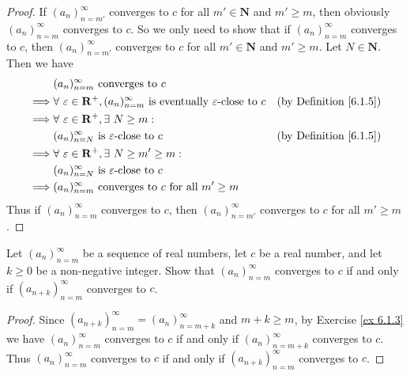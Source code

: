 \begin{proof}
    If \((a_n)_{n = m'}^\infty\) converges to \(c\) for all \(m' \in \mathbf{N}\) and \(m' \geq m\), then obviously \((a_n)_{n = m}^\infty\) converges to \(c\).
    So we only need to show that if \((a_n)_{n = m}^\infty\) converges to \(c\), then \((a_n)_{n = m'}^\infty\) converges to \(c\) for all \(m' \in \mathbf{N}\) and \(m' \geq m\).
    Let \(N \in \mathbf{N}\).
    Then we have
    \begin{align*}
                 & (a_n)_{n = m}^\infty \text{ converges to } c                                                                                                           \\
        \implies & \forall\ \varepsilon \in \mathbf{R}^+, (a_n)_{n = m}^\infty \text{ is eventually } \varepsilon\text{-close to } c & \text{(by Definition \ref{6.1.5})} \\
        \implies & \forall\ \varepsilon \in \mathbf{R}^+, \exists\ N \geq m :                                                                                             \\
                 & (a_n)_{n = N}^\infty \text{ is } \varepsilon\text{-close to } c                                                   & \text{(by Definition \ref{6.1.5})} \\
        \implies & \forall\ \varepsilon \in \mathbf{R}^+, \exists\ N \geq m' \geq m :                                                                                     \\
                 & (a_n)_{n = N}^\infty \text{ is } \varepsilon\text{-close to } c                                                                                        \\
        \implies & (a_n)_{n = m}^\infty \text{ converges to } c \text{ for all } m' \geq m
    \end{align*}
    Thus if \((a_n)_{n = m}^\infty\) converges to \(c\), then \((a_n)_{n = m'}^\infty\) converges to \(c\) for all \(m' \geq m\).
\end{proof}

\begin{exercise}\label{ex 6.1.4}
    Let \((a_n)_{n = m}^\infty\) be a sequence of real numbers, let \(c\) be a real number, and let \(k \geq 0\) be a non-negative integer.
    Show that \((a_n)_{n = m}^\infty\) converges to \(c\) if and only if \((a_{n + k})_{n = m}^\infty\) converges to \(c\).
\end{exercise}

\begin{proof}
    Since \((a_{n + k})_{n = m}^\infty = (a_n)_{n = m + k}^\infty\) and \(m + k \geq m\), by Exercise \ref{ex 6.1.3} we have \((a_n)_{n = m}^\infty\) converges to \(c\) if and only if \((a_n)_{n = m + k}^\infty\) converges to \(c\).
    Thus \((a_n)_{n = m}^\infty\) converges to \(c\) if and only if \((a_{n + k})_{n = m}^\infty\) converges to \(c\).
\end{proof}

